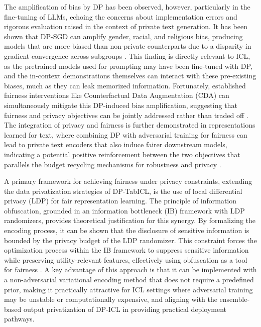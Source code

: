 \documentclass[11pt]{article}
\begin{document}
The amplification of bias by DP has been observed, however, particularly in the fine-tuning of LLMs, echoing the concerns about implementation errors and rigorous evaluation raised in the context of private text generation. It has been shown that DP-SGD can amplify gender, racial, and religious bias, producing models that are more biased than non-private counterparts due to a disparity in gradient convergence across subgroups \cite{ref470}. This finding is directly relevant to ICL, as the pretrained models used for prompting may have been fine-tuned with DP, and the in-context demonstrations themselves can interact with these pre-existing biases, much as they can leak memorized information. Fortunately, established fairness interventions like Counterfactual Data Augmentation (CDA) can simultaneously mitigate this DP-induced bias amplification, suggesting that fairness and privacy objectives can be jointly addressed rather than traded off \cite{ref470}. The integration of privacy and fairness is further demonstrated in representations learned for text, where combining DP with adversarial training for fairness can lead to private text encoders that also induce fairer downstream models, indicating a potential positive reinforcement between the two objectives that parallels the budget recycling mechanisms for robustness and privacy \cite{ref471}.

A primary framework for achieving fairness under privacy constraints, extending the data privatization strategies of DP-TabICL, is the use of local differential privacy (LDP) for fair representation learning. The principle of information obfuscation, grounded in an information bottleneck (IB) framework with LDP randomizers, provides theoretical justification for this synergy. By formalizing the encoding process, it can be shown that the disclosure of sensitive information is bounded by the privacy budget of the LDP randomizer. This constraint forces the optimization process within the IB framework to suppress sensitive information while preserving utility-relevant features, effectively using obfuscation as a tool for fairness \cite{ref472}. A key advantage of this approach is that it can be implemented with a non-adversarial variational encoding method that does not require a predefined prior, making it practically attractive for ICL settings where adversarial training may be unstable or computationally expensive, and aligning with the ensemble-based output privatization of DP-ICL in providing practical deployment pathways.
\end{document}
